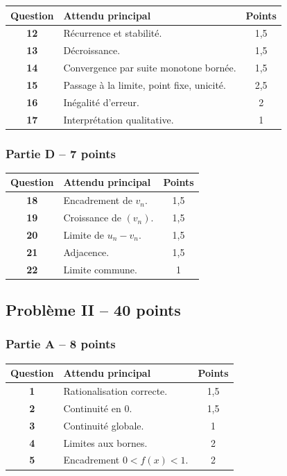 \documentclass[11pt,a4paper]{article}
\begin{document}
\begin{tabularx}{\linewidth}{>{\bfseries}c X c}
\toprule
Question & Attendu principal & Points \\
\midrule
12 & Récurrence et stabilité. & 1,5 \\
13 & Décroissance. & 1,5 \\
14 & Convergence par suite monotone bornée. & 1,5 \\
15 & Passage à la limite, point fixe, unicité. & 2,5 \\
16 & Inégalité d'erreur. & 2 \\
17 & Interprétation qualitative. & 1 \\
\bottomrule
\end{tabularx}

\subsubsection*{Partie D -- 7 points}

\begin{tabularx}{\linewidth}{>{\bfseries}c X c}
\toprule
Question & Attendu principal & Points \\
\midrule
18 & Encadrement de \(v_n\). & 1,5 \\
19 & Croissance de \((v_n)\). & 1,5 \\
20 & Limite de \(u_n-v_n\). & 1,5 \\
21 & Adjacence. & 1,5 \\
22 & Limite commune. & 1 \\
\bottomrule
\end{tabularx}


\subsection*{Problème II -- 40 points}

\subsubsection*{Partie A -- 8 points}

\begin{tabularx}{\linewidth}{>{\bfseries}c X c}
\toprule
Question & Attendu principal & Points \\
\midrule
1 & Rationalisation correcte. & 1,5 \\
2 & Continuité en \(0\). & 1,5 \\
3 & Continuité globale. & 1 \\
4 & Limites aux bornes. & 2 \\
5 & Encadrement \(0<f(x)<1\). & 2 \\
\bottomrule
\end{tabularx}
\end{document}
